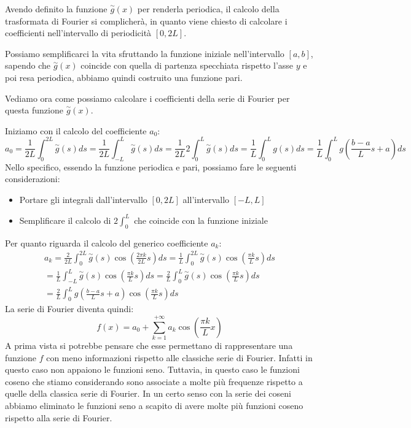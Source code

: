Avendo definito la funzione $\stackrel{\sim}{g}(x)$ per renderla periodica, il
calcolo della trasformata di Fourier si complicherà, in quanto viene chiesto di
calcolare i coefficienti nell'intervallo di periodicità $[0, 2L]$.

Possiamo semplificarci la vita sfruttando la funzione iniziale nell'intervallo
$[a,b]$, sapendo che $\stackrel{\sim}{g}(x)$ coincide con quella di partenza
specchiata rispetto l'asse $y$ e poi resa periodica, abbiamo quindi costruito una
funzione pari.

Vediamo ora come possiamo calcolare i coefficienti della serie di Fourier per
questa funzione $\stackrel{\sim}{g}(x)$.

Iniziamo con il calcolo del coefficiente $a_0$:
\begin{equation}
    a_0 = \frac{1}{2L} \int_{0}^{2L} \stackrel{\sim}{g}(s)ds = \frac{1}{2L}
    \int_{-L}^{L} \stackrel{\sim}{g}(s)ds = \frac{1}{2L} 2 \int_{0}^{L} \stackrel{\sim}{g}(s)ds
    = \frac{1}{L} \int_{0}^{L} g(s)ds = \frac{1}{L} \int_{0}^{L} g\left(\frac{b - a}{L} s + a\right)ds
\end{equation}
Nello specifico, essendo la funzione periodica e pari, possiamo fare le seguenti
considerazioni:
\begin{itemize}
    \item Portare gli integrali dall'intervallo $[0,2L]$ all'intervallo $[-L,L]$
    \item Semplificare il calcolo di $2\int_{0}^{L}$ che coincide con la funzione iniziale
\end{itemize}
Per quanto riguarda il calcolo del generico coefficiente $a_k$:
\begin{equation}
    \begin{array}{l}
        a_k = \frac{2}{2L} \int_{0}^{2L} \stackrel{\sim}{g}(s) \cos\left(\frac{2\pi k}{2L}s\right)ds
        = \frac{1}{L} \int_{0}^{2L} \stackrel{\sim}{g}(s) \cos\left(\frac{\pi k}{L}s\right)ds \\
        = \frac{1}{L} \int_{-L}^{L} \stackrel{\sim}{g}(s) \cos\left(\frac{\pi k}{L}s\right)ds
        = \frac{2}{L} \int_{0}^{L} \stackrel{\sim}{g}(s) \cos\left(\frac{\pi k}{L}s\right)ds  \\
        = \frac{2}{L} \int_{0}^{L} g\left(\frac{b - a}{L} s  + a\right) \cos\left(\frac{\pi k}{L}s\right)ds
    \end{array}
\end{equation}
La serie di Fourier diventa quindi:
\begin{equation}
    f(x) = a_0 + \sum_{k=1}^{+\infty} a_k \cos\left(\frac{\pi k}{L}x\right)
\end{equation}
A prima vista si potrebbe pensare che esse permettano di rappresentare una
funzione $f$ con meno informazioni rispetto alle classiche serie di Fourier.
Infatti in questo caso non appaiono le funzioni seno. Tuttavia, in questo caso le
funzioni coseno che stiamo considerando sono associate a molte più frequenze
rispetto a quelle della classica serie di Fourier. In un certo senso con la serie
dei coseni abbiamo eliminato le funzioni seno a scapito di avere molte più funzioni
coseno rispetto alla serie di Fourier.
